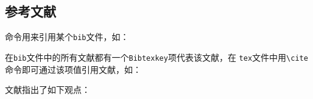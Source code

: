 \subsection{参考文献}

命令\verb!!用来引用某个\texttt{bib}文件，如：
\begin{code}
  
\end{code}

在\texttt{bib}文件中的所有文献都有一个\texttt{Bibtexkey}项代表该文献，在
\texttt{tex}文件中用\verb!\cite!命令即可通过该项值引用文献，如：

\begin{code}
  文献\cite{Wu2010}指出了如下观点：
\end{code}

